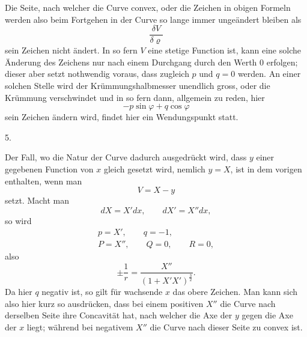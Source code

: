 \par{}%
\noindent\hspace*{1.2em}Die Seite, nach welcher die Curve convex, oder die Zeichen in obigen Formeln werden also beim Fortgehen in der Curve so lange immer ungeändert bleiben als
\[
\frac{\delta V}{\delta\varrho}
\]
sein Zeichen nicht ändert. In so fern $V$ eine stetige Function ist, kann eine solche Änderung des Zeichens nur nach einem Durchgang durch den Werth $0$ erfolgen; dieser aber setzt nothwendig voraus, dass zugleich $p$ und $q=0$ werden. An einer solchen Stelle wird der Krümmungshalbmesser unendlich gross, oder die Krümmung verschwindet und in so fern dann, allgemein zu reden, hier
\[
-p\sin\varphi+q\cos\varphi
\]
sein Zeichen ändern wird, findet hier ein Wendungspunkt statt.

\begin{center}5.\end{center}
\noindent\hspace*{1.2em}Der Fall, wo die Natur der Curve dadurch ausgedrückt wird, dass $y$ einer gegebenen Function von $x$ gleich gesetzt wird, nemlich $y=X$, ist in dem vorigen enthalten, wenn man
\[
V=X-y
\]
setzt. Macht man
\[
dX=X'dx,\qquad dX'=X''dx,
\]
so wird
\[
\begin{gathered}
p=X',\qquad q=-1,\\
P=X'',\qquad Q=0,\qquad R=0,
\end{gathered}
\]
also
\[
\pm\frac1r=\frac{X''}{(1+X'X')^{\frac32}}.
\]
Da hier $q$ negativ ist, so gilt für wachsende $x$ das obere Zeichen. Man kann sich also hier kurz so ausdrücken, dass bei einem positiven $X''$ die Curve nach derselben Seite ihre Concavität hat, nach welcher die Axe der $y$ gegen die Axe der $x$ liegt; während bei negativem $X''$ die Curve nach dieser Seite zu convex ist.
